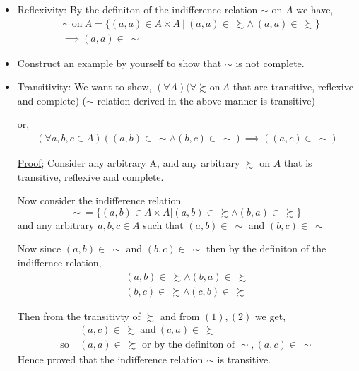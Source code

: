 \documentclass[12pt,a4paper]{article}
\begin{document}
  \begin{itemize}
    \item Reflexivity:
    By the definiton of the indifference relation \(\sim \) on \(A\) we have,      
     \begin{align*} 
      & \sim \ \text{on} \ A = \{(a,a) \in A \times A \ | \ (a,a) \in \ \succsim \wedge \ (a,a) \in \ \succsim \} \\
      & \implies (a,a) \in \ \sim   
    \end{align*}
    \item Construct an example by yourself to show that \(\sim \) is not complete.
    \item Transitivity: We want to show,
    \(\left( \forall A  \right) (\forall \succsim  \text{on} \ A \)
    that are 
    transitive, reflexive and complete) (\(\sim \) relation derived in the above manner is transitive)  
    
   or, 
     \begin{align*}
        \left( \forall a,b,c \in A \right) \left( \left( a,b \right) \in \ \sim \wedge \left( b,c \right) \in \ \sim  \right) \implies \left( \left( a,c \right) \in \ \sim \right)  
    \end{align*}
    
    \begin{tcolorbox}
      \underline{Proof}; Consider any arbitrary A, and any arbitrary \(\succsim \) on \(A\) that is transitive, reflexive and complete.
      
      Now consider the indifference relation 
      \begin{equation*}
          \sim \ = \{\left( a,b \right) \in A \times A | \left( a,b \right) \in \ \succsim \wedge \left( b,a \right) \in \ \succsim \}
      \end{equation*}
      and any arbitrary \(a,b,c \in A \) such that  \(\left( a,b \right) \in \ \sim \) and \(\left( b,c \right) \in \ \sim  \) 
      
      Now since \(\left( a,b \right) \in \ \sim \) and \(\left( b,c \right) \in \ \sim \)   then by the definiton of the indiffernce relation,
      \begin{align}
          \left( a,b \right) \in \ \succsim \wedge \left( b,a \right) \in \ \succsim \\
          \left( b,c \right) \in \ \succsim \wedge \left( c,b \right) \in \ \succsim
      \end{align}    

      Then from the transitivty of \(\succsim \) and from \((1),(2)\) we get,
      \begin{align*}
        & \left( a,c \right) \in \ \succsim \ \text{and} \ \left( c,a \right) \in \ \succsim \\
        \text{so} \ & (a,a) \in \ \succsim \text{ or by the definiton of } \sim , \left( a,c \right) \in \ \sim
      \end{align*}
      Hence proved that the indifference relation \(\sim \)  is transitive. 
    \end{tcolorbox}
    \pagebreak


\end{itemize}
\end{document}
